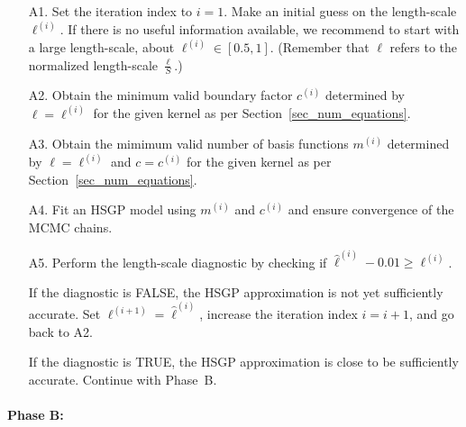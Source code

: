 \begin{enumerate}

\item[A1.] Set the iteration index to $i=1$. Make an initial guess on the length-scale $\ell^{(i)}$. If there is no useful information available, we recommend to start with a large length-scale, about $\ell^{(i)} \in [0.5, 1]$. ({\color{blue}Remember that $\ell$ refers to the normalized length-scale $\frac{\ell}{S}$.})

\item[A2.] Obtain the minimum valid boundary factor $c^{(i)}$ determined by $\ell = \ell^{(i)}$ for the given kernel as per Section~\ref{sec_num_equations}.

\item[A3.] Obtain the mimimum valid number of basis functions $m^{(i)}$ determined by $\ell = \ell^{(i)}$ and $c = c^{(i)}$ for the given kernel as per Section~\ref{sec_num_equations}. 

\item[A4.] Fit an HSGP model using $m^{(i)}$ and $c^{(i)}$ and ensure convergence of the MCMC chains.

\item[A5.] Perform the length-scale diagnostic by checking if $\hat{\ell}^{(i)} - 0.01 \geq \ell^{(i)}$. 

If the diagnostic is FALSE, the HSGP approximation is not yet sufficiently accurate. Set $\ell^{(i+1)} = \hat{\ell}^{(i)}$, increase the iteration index $i = i + 1$, and go back to A2.

If the diagnostic is TRUE, the HSGP approximation is close to be sufficiently accurate. Continue with Phase~B.

\end{enumerate}

\paragraph*{Phase B:}

